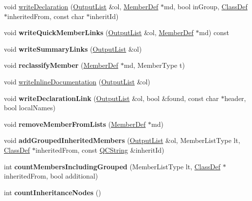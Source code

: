\begin{DoxyCompactItemize}
\item 
void \hyperlink{class_class_def_a6abd78845db5eba02bf4e71eea182274}{write\-Declaration} (\hyperlink{class_output_list}{Output\-List} \&ol, \hyperlink{class_member_def}{Member\-Def} $\ast$md, bool in\-Group, \hyperlink{class_class_def}{Class\-Def} $\ast$inherited\-From, const char $\ast$inherit\-Id)
\item 
\hypertarget{class_class_def_ad26fab38253105173dfb5b116712edb8}{void {\bfseries write\-Quick\-Member\-Links} (\hyperlink{class_output_list}{Output\-List} \&ol, \hyperlink{class_member_def}{Member\-Def} $\ast$md) const }\label{class_class_def_ad26fab38253105173dfb5b116712edb8}

\item 
\hypertarget{class_class_def_a237e7cf83c23d0d5ac812e3c37800a3f}{void {\bfseries write\-Summary\-Links} (\hyperlink{class_output_list}{Output\-List} \&ol)}\label{class_class_def_a237e7cf83c23d0d5ac812e3c37800a3f}

\item 
\hypertarget{class_class_def_ad58c00cf5c5b1d7882f427d46b2bdad7}{void {\bfseries reclassify\-Member} (\hyperlink{class_member_def}{Member\-Def} $\ast$md, Member\-Type t)}\label{class_class_def_ad58c00cf5c5b1d7882f427d46b2bdad7}

\item 
void \hyperlink{class_class_def_af6f05ddea4c40c3d792e60b01a48e7e1}{write\-Inline\-Documentation} (\hyperlink{class_output_list}{Output\-List} \&ol)
\item 
\hypertarget{class_class_def_ae5a5d13dcb983865df32a9c64f035128}{void {\bfseries write\-Declaration\-Link} (\hyperlink{class_output_list}{Output\-List} \&ol, bool \&found, const char $\ast$header, bool local\-Names)}\label{class_class_def_ae5a5d13dcb983865df32a9c64f035128}

\item 
\hypertarget{class_class_def_a1650c8a8dae0160eb845174a66478d8d}{void {\bfseries remove\-Member\-From\-Lists} (\hyperlink{class_member_def}{Member\-Def} $\ast$md)}\label{class_class_def_a1650c8a8dae0160eb845174a66478d8d}

\item 
\hypertarget{class_class_def_a8ff4b0318a265e6c51e26683bfeb6dca}{void {\bfseries add\-Grouped\-Inherited\-Members} (\hyperlink{class_output_list}{Output\-List} \&ol, Member\-List\-Type lt, \hyperlink{class_class_def}{Class\-Def} $\ast$inherited\-From, const \hyperlink{class_q_c_string}{Q\-C\-String} \&inherit\-Id)}\label{class_class_def_a8ff4b0318a265e6c51e26683bfeb6dca}

\item 
\hypertarget{class_class_def_a59989b93fab34cfa2021045eb56b8012}{int {\bfseries count\-Members\-Including\-Grouped} (Member\-List\-Type lt, \hyperlink{class_class_def}{Class\-Def} $\ast$inherited\-From, bool additional)}\label{class_class_def_a59989b93fab34cfa2021045eb56b8012}

\item 
\hypertarget{class_class_def_a9d29d3b79360c12d10be0c49af9bdb05}{int {\bfseries count\-Inheritance\-Nodes} ()}\label{class_class_def_a9d29d3b79360c12d10be0c49af9bdb05}

\end{DoxyCompactItemize}
